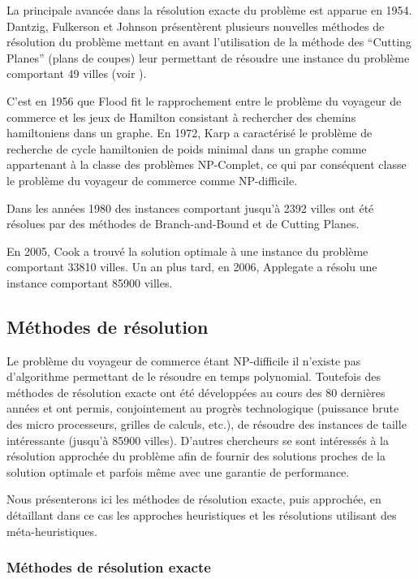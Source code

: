  La principale avancée dans la résolution exacte du problème est apparue en 1954. Dantzig, Fulkerson et Johnson présentèrent plusieurs nouvelles méthodes de résolution du problème mettant en avant l'utilisation de la méthode des ``Cutting Planes'' (plans de coupes) leur permettant de résoudre une instance du problème comportant 49 villes (voir \cite{Dantzig1954}).
 
 C'est en 1956 que Flood fit le rapprochement entre le problème du voyageur de commerce et les jeux de Hamilton consistant à rechercher des chemins hamiltoniens dans un graphe. En 1972, Karp a caractérisé le problème de recherche de cycle hamiltonien de poids minimal dans un graphe comme appartenant à la classe des problèmes NP-Complet, ce qui par conséquent classe le problème du voyageur de commerce comme NP-difficile.
 
 Dans les années 1980 des instances comportant jusqu'à 2392 villes ont été résolues par des méthodes de Branch-and-Bound et de Cutting Planes.
 
 En 2005, Cook a trouvé la solution optimale à une instance du problème comportant 33810 villes. Un an plus tard, en 2006, Applegate a résolu une instance comportant 85900 villes.

\subsection{Méthodes de résolution}

Le problème du voyageur de commerce étant NP-difficile il n'existe pas d'algorithme permettant de le résoudre en temps polynomial. Toutefois des méthodes de résolution exacte ont été développées au cours des 80 dernières années et ont permis, conjointement au progrès technologique (puissance brute des micro processeurs, grilles de calculs, etc.), de résoudre des instances de taille intéressante (jusqu'à 85900 villes). D'autres chercheurs se sont intéressés à la résolution approchée du problème afin de fournir des solutions proches de la solution optimale et parfois même avec une garantie de performance.

Nous présenterons ici les méthodes de résolution exacte, puis approchée, en détaillant dans ce cas les approches heuristiques et les résolutions utilisant des méta-heuristiques.

\subsubsection{Méthodes de résolution exacte}

